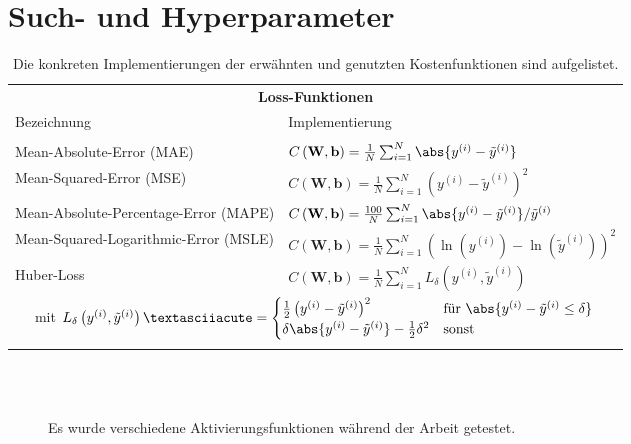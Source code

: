 \section{Such- und Hyperparameter}
\begin{table}[hb!]
	\centering
	\caption{Die konkreten Implementierungen der erwähnten und genutzten Kostenfunktionen sind aufgelistet.}
	\begin{tabular}{ll}
		\multicolumn{2}{c}{\textbf{Loss-Funktionen}}\\[10pt]
		Bezeichnung & Implementierung \\
		\hline\\[-10pt]
		Mean-Absolute-Error (MAE) &$C\left(\mathbf{W}, \mathbf{b}\right) = \frac{1}{N} \sum_{i=1}^{N} \abs{y^{(i)} - \tilde{y}^{(i)}}$\\[10pt]
		Mean-Squared-Error (MSE) & $C\left(\mathbf{W}, \mathbf{b}\right) = \frac{1}{N} \sum_{i=1}^{N} \left(y^{(i)} - \tilde{y}^{(i)}\right)^2$\\[10pt]
		Mean-Absolute-Percentage-Error (MAPE) & $C\left(\mathbf{W}, \mathbf{b}\right) = \frac{100}{N} \sum_{i=1}^{N} {\abs{y^{(i)} - \tilde{y}^{(i)}}  }/{\tilde{y}^{(i)}}$\\[10pt]
		Mean-Squared-Logarithmic-Error (MSLE) &$C\left(\mathbf{W}, \mathbf{b}\right) = \frac{1}{N} \sum_{i=1}^{N} \left(\ln(y^{(i)}) - \ln(\tilde{y}^{(i)})\right)^2$ \\[10pt]
		Huber-Loss & $C\left(\mathbf{W}, \mathbf{b}\right) = \frac{1}{N} \sum_{i=1}^{N} L_{\delta}\left(y^{(i)}, \tilde{y}^{(i)}\right)$\\[10pt]
		\multicolumn{2}{c}{\hspace{1cm} mit \hspace{1cm} $L_{\delta}\left(y^{(i)}, \tilde{y}^{(i)}\right)´=\begin{cases}
			\frac{1}{2}\left(y^{(i)} -  \tilde{y}^{(i)}\right)^2 \quad &\text{für}~\abs{y^{(i)} -  \tilde{y}^{(i)} \leq \delta} \\
			\delta \abs{y^{(i)} -  \tilde{y}^{(i)}} - \frac{1}{2}\delta^2 &\text{sonst}
			\end{cases}$} \\
		\\[-10pt]
		\hline
	\end{tabular}
	\label{Loss-Funktionen-Tabelle}
\end{table}
\begin{figure}
	\centering
	 \\
	 \\
	\caption{Es wurde verschiedene Aktivierungsfunktionen während der Arbeit getestet.}
	\label{Aktivierungsfunktionen}
\end{figure}
